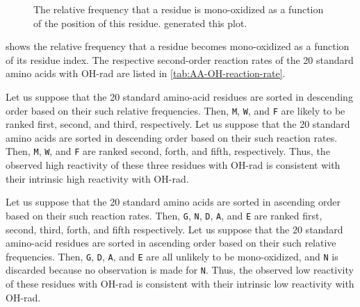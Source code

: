 \begin{figure}
\begin{center}
\end{center}
\caption[
	The relative frequency that a residue is \gls{mono-oxidized} as a function of the position of this residue.]{
	The relative frequency that a residue is \gls{mono-oxidized} as a function of the position of this residue.
	 generated this plot. 
	\label{plot_ox_vs_pepidx}} %
\end{figure}

 shows the relative frequency that a residue becomes \gls{mono-oxidized} as a function of its residue index.
The respective second-order reaction rates of the 20 standard amino acids with \gls{OH-rad} are listed in \cref{tab:AA-OH-reaction-rate}.

Let us suppose that the 20 standard amino-acid residues are sorted in descending order based on their such relative frequencies.
Then, \texttt{M}, \texttt{W}, and \texttt{F} are likely to be ranked first, second, and third, respectively.
Let us suppose that the 20 standard amino acids are sorted in descending order based on their such reaction rates.
Then, \texttt{M}, \texttt{W}, and \texttt{F} are ranked second, forth, and fifth, respectively.	
Thus, the observed high reactivity of these three residues with \gls{OH-rad} is consistent with their intrinsic high reactivity with \gls{OH-rad}.

Let us suppose that the 20 standard amino acids are sorted in ascending order based on their such reaction rates.
Then, \texttt{G}, \texttt{N}, \texttt{D}, \texttt{A}, and \texttt{E} are ranked first, second, third, forth, and fifth respectively.
Let us suppose that the 20 standard amino-acid residues are sorted in ascending order based on their such relative frequencies.
Then, \texttt{G}, \texttt{D}, \texttt{A}, and \texttt{E} are all unlikely to be \gls{mono-oxidized},
	and \texttt{N} is discarded because no observation is made for \texttt{N}.
Thus, the observed low reactivity of these residues with \gls{OH-rad} is consistent with their intrinsic low reactivity with \gls{OH-rad}.
		
